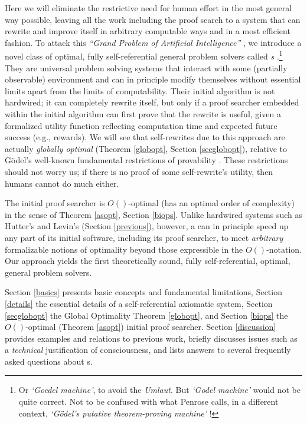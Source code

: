Here we will eliminate the restrictive need for human 
effort in the most general way possible, 
leaving all the work
including the proof search to a system
that can rewrite and improve itself in arbitrary 
computable ways and in a most efficient fashion.
To attack this {\em ``Grand Problem of Artificial Intelligence''}
\cite{Schmidhuber:03grandai},
we introduce a novel class of optimal,
fully self-referential \cite{Goedel:31}
general problem solvers called 
{\em \gmn s} \cite{Schmidhuber:03gm,Schmidhuber:04gmhtml,Schmidhuber:05icann,Schmidhuber:05gmai,Schmidhuber:05gmconscious}.\footnote{Or {\em `Goedel machine'}, to
avoid the {\em Umlaut}. But
{\em `Godel machine'} would not be quite correct.
Not to be confused with what Penrose
calls, in a different context,
{\em `G\"{o}del's putative theorem-proving machine'} \cite{Penrose:94}!}
They are universal problem solving systems that
interact with some (partially observable) environment and 
can in principle modify themselves without essential limits
apart from the limits of computability.  
Their initial algorithm is not hardwired;
it can completely rewrite itself,
but only if a proof searcher embedded within the initial algorithm 
can first prove that the rewrite is useful, 
given a formalized utility function reflecting 
computation time and
expected future success (e.g., rewards).
We will see that self-rewrites due to this approach 
are actually {\em globally optimal} (Theorem \ref{globopt}, 
Section \ref{secglobopt}), relative to G\"{o}del's 
well-known fundamental restrictions of provability \cite{Goedel:31}.
These restrictions should not worry us;
if there is no proof of some self-rewrite's utility, then humans
cannot do much either.

The initial proof searcher is $O()$-optimal 
(has an optimal order of complexity)
in the sense of Theorem \ref{asopt},  Section \ref{biops}. 
Unlike hardwired systems such as Hutter's 
\cite{Hutter:01aixi+,Hutter:01fast+}
and Levin's \cite{Levin:73,Levin:84}
(Section \ref{previous}),
however, a \gm can in principle speed up any part of its
initial software, including its proof searcher, to meet 
{\em arbitrary} formalizable notions of optimality beyond those
expressible in the $O()$-notation.  Our approach yields the first
theoretically sound, fully self-referential,
optimal, general problem solvers.

 Section \ref{basics} presents basic concepts 
and fundamental limitations, Section \ref{details} 
the essential details of a self-referential axiomatic system,
Section \ref{secglobopt} the Global Optimality Theorem \ref{globopt}, 
and Section \ref{biops} the $O()$-optimal 
(Theorem \ref{asopt}) initial proof searcher. 
Section \ref{discussion} provides examples
and relations to previous work,
briefly discusses issues such as 
a {\em technical} justification of consciousness,
and lists answers to several frequently asked questions
about \gmn s.

